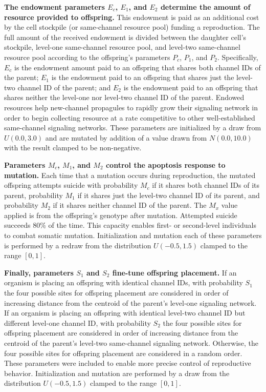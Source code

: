 \textbf{
The endowment parameters $E_{c}$, $E_1$, and $E_2$ determine the amount of resource provided to offspring.
}
This endowment is paid as an additional cost by the cell stockpile (or same-channel resource pool) funding a reproduction.
The full amount of the received endowment is divided between the daughter cell's stockpile, level-one same-channel resource pool, and level-two same-channel resource pool according to the offspring's parameters $P_{c}$, $P_1$, and $P_2$.
Specifically, $E_{c}$ is the endowment amount paid to an offspring that shares both channel IDs of the parent;
$E_1$ is the endowment paid to an offspring that shares just the level-two channel ID of the parent;
and $E_2$ is the endowment paid to an offspring that shares neither the level-one nor level-two channel ID of the parent.
Endowed resources help new-channel propagules to rapidly grow their signaling network in order to begin collecting resource at a rate competitive to other well-established same-channel signaling networks.
These parameters are initialized by a draw from $U(0.0, 3.0)$ and are mutated by addition of a value drawn from $N(0.0,10.0)$ with the result clamped to be non-negative.

\textbf{
Parameters $M_{c}$, $M_1$, and $M_2$ control the apoptosis response to mutation.
}
Each time that a mutation occurs during reproduction, the mutated offspring attempts suicide with probability $M_{c}$ if it shares both channel IDs of its parent, probability $M_1$ if it shares just the level-two channel ID of its parent, and probability $M_2$ if it shares neither channel ID of the parent.
The $M_x$ value applied is from the offspring's genotype after mutation.
Attempted suicide succeeds 80\% of the time.
This capacity enables first- or second-level individuals to combat somatic mutation.
Initialization and mutation each of these parameters is performed by a redraw from the distribution $U(-0.5,1.5)$ clamped to the range $[0,1]$.

\textbf{
Finally, parameters $S_1$ and $S_2$ fine-tune offspring placement.
}
If an organism is placing an offspring with identical channel IDs, with probability $S_1$ the four possible sites for offspring placement are considered in order of increasing distance from the centroid of the parent's level-one signaling network.
If an organism is placing an offspring with identical level-two channel ID but different level-one channel ID, with probability $S_2$ the four possible sites for offspring placement are considered in order of increasing distance from the centroid of the parent's level-two same-channel signaling network.
Otherwise, the four possible sites for offspring placement are considered in a random order.
These parameters were included to enable more precise control of reproductive behavior.
Initialization and mutation are performed by a draw from the distribution $U(-0.5,1.5)$ clamped to the range $[0,1]$.

